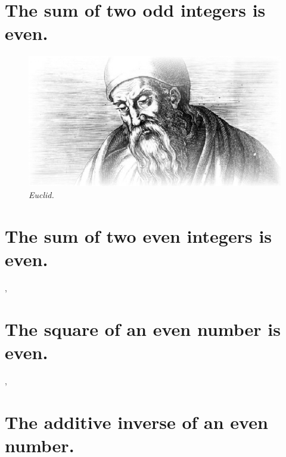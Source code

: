 \documentclass[preview]{standalone}
\begin{document}
\section{The sum of two odd integers is even.}
\begin{figure}[h!]
    \centering
    \includegraphics[width=12cm]{../resources/jpg/1.6.introduction.to.proofs/euclid.jpg}
    \caption*{\emph{Euclid.}}
\end{figure} 

\pagebreak


\section{The sum of two even integers is even.}

\sep


\section{The square of an even number is even.}

\sep


\section{The additive inverse of an even number.}
 
\pagebreak


\end{document}
